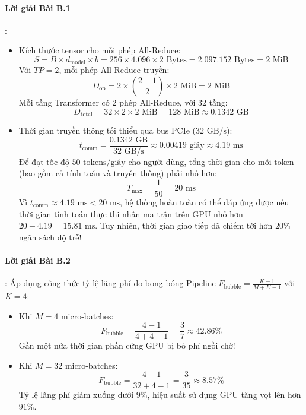 \paragraph{Lời giải Bài B.1}:
\begin{itemize}
  \item[a)] Kích thước tensor cho mỗi phép All-Reduce:
  \begin{equation*}
  S = B \times d_{\text{model}} \times b = 256 \times 4.096 \times 2\text{ Bytes} = 2.097.152\text{ Bytes} = 2\text{ MiB}
  \end{equation*}
  Với $TP = 2$, mỗi phép All-Reduce truyền:
  \begin{equation*}
  D_{\text{op}} = 2 \times \left( \frac{2 - 1}{2} \right) \times 2\text{ MiB} = 2\text{ MiB}
  \end{equation*}
  Mỗi tầng Transformer có 2 phép All-Reduce, với 32 tầng:
  \begin{equation*}
  D_{\text{total}} = 32 \times 2 \times 2\text{ MiB} = 128\text{ MiB} \approx 0.1342\text{ GB}
  \end{equation*}

  \item[b)] Thời gian truyền thông tối thiểu qua bus PCIe ($32\text{ GB/s}$):
  \begin{equation*}
  t_{\text{comm}} = \frac{0.1342\text{ GB}}{32\text{ GB/s}} \approx 0.00419\text{ giây} \approx 4.19\text{ ms}
  \end{equation*}
  Để đạt tốc độ $50\text{ tokens/giây}$ cho người dùng, tổng thời gian cho mỗi token (bao gồm cả tính toán và truyền thông) phải nhỏ hơn:
  \begin{equation*}
  T_{\text{max}} = \frac{1}{50} = 20\text{ ms}
  \end{equation*}
  Vì $t_{\text{comm}} \approx 4.19\text{ ms} < 20\text{ ms}$, hệ thống hoàn toàn có thể đáp ứng được nếu thời gian tính toán thực thi nhân ma trận trên GPU nhỏ hơn $20 - 4.19 = 15.81\text{ ms}$. Tuy nhiên, thời gian giao tiếp đã chiếm tới hơn $20\%$ ngân sách độ trễ!
\end{itemize}

\paragraph{Lời giải Bài B.2}:
Áp dụng công thức tỷ lệ lãng phí do bong bóng Pipeline $F_{\text{bubble}} = \frac{K - 1}{M + K - 1}$ với $K = 4$:
\begin{itemize}
  \item Khi $M = 4$ micro-batches:
  \begin{equation*}
  F_{\text{bubble}} = \frac{4 - 1}{4 + 4 - 1} = \frac{3}{7} \approx 42.86\%
  \end{equation*}
  Gần một nửa thời gian phần cứng GPU bị bỏ phí ngồi chờ!

  \item Khi $M = 32$ micro-batches:
  \begin{equation*}
  F_{\text{bubble}} = \frac{4 - 1}{32 + 4 - 1} = \frac{3}{35} \approx 8.57\%
  \end{equation*}
  Tỷ lệ lãng phí giảm xuống dưới $9\%$, hiệu suất sử dụng GPU tăng vọt lên hơn $91\%$.
\end{itemize}

